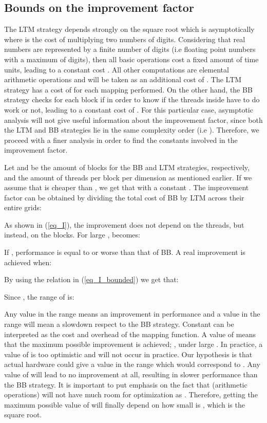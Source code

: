 \documentclass[conference]{IEEEtran}
\begin{document}
\subsection{Bounds on the improvement factor}
The LTM strategy depends strongly on the square root which is asymptotically  \cite{Ypma:1995:HDN:222504.222510} where  is the cost of multiplying 
two numbers of  digits. 
Considering that real numbers are represented by a finite number of digits 
(i.e floating point numbers with a maximum of  digits), then all basic operations cost a fixed amount of
time units, leading to a constant cost . All other computations are elemental arithmetic operations and 
will be taken as an additional cost of . The LTM strategy has a cost of 
 for each mapping performed. 
On the other hand, the BB strategy checks for each block if  in order 
to know if the threads inside have to do work or not, leading to a constant cost of . 
For this particular case, asymptotic analysis will not give useful information about the improvement factor, since both the 
LTM and BB strategies lie in the same complexity order (i.e ). Therefore, 
we proceed with a finer analysis in order to find the constants involved in the improvement factor.

Let  and  be the amount of blocks for the BB and LTM strategies, respectively, and  the amount of threads 
per block per dimension as mentioned earlier. If we assume that  is cheaper than , we get that  with a 
constant . The improvement factor  can be obtained by dividing the total cost of BB by LTM across their entire 
grids:

As shown in (\ref{eq_I}), the improvement does not depend on the threads, but instead, on the blocks. For large ,  becomes:

If , performance is equal to or worse than that of BB. 
A real improvement is achieved when:

By using the relation  in (\ref{eq_I_bounded}) we get that:

Since , the range of  is:

Any value in the range  means an improvement in performance and a value in the range  will mean a 
slowdown respect to the BB strategy.
Constant  can be interpreted as the cost and overhead of the mapping function. 
A value of  means that the maximum possible improvement is achieved; , under large .
In practice, a value of  is too optimistic and will not occur in practice. Our hypothesis is that actual hardware could give a value in the range 
 which would correspond to . Any value of  will lead 
to no improvement at all, resulting in slower performance than the BB strategy. 
It is important to put emphasis on the fact that  (arithmetic operations) will not have much room for optimization as . 
Therefore, getting the maximum possible value of  will finally depend on how small is , which is the square root. 
\end{document}
